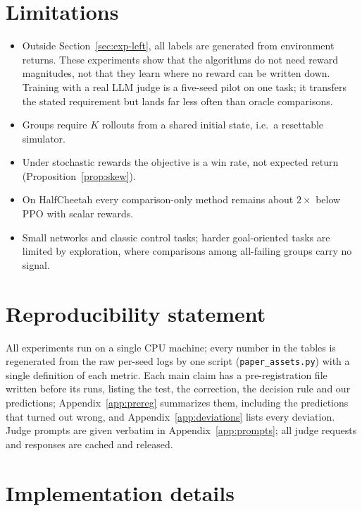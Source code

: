 \documentclass[11pt]{article}
\theoremstyle{remark}
\begin{document}
\section{Limitations}
\begin{itemize}
\item Outside Section~\ref{sec:exp-left}, all labels are generated from environment returns. These experiments show that the algorithms do not need reward magnitudes, not that they learn where no reward can be written down. Training with a real LLM judge is a five-seed pilot on one task; it transfers the stated requirement but lands far less often than oracle comparisons.
\item Groups require $K$ rollouts from a shared initial state, i.e.\ a resettable simulator.
\item Under stochastic rewards the objective is a win rate, not expected return (Proposition~\ref{prop:skew}).
\item On HalfCheetah every comparison-only method remains about $2\times$ below PPO with scalar rewards.
\item Small networks and classic control tasks; harder goal-oriented tasks are limited by exploration, where comparisons among all-failing groups carry no signal.
\end{itemize}


\section*{Reproducibility statement}
All experiments run on a single CPU machine; every number in the tables is regenerated from the raw per-seed logs by one script (\texttt{paper\_assets.py}) with a single definition of each metric. Each main claim has a pre-registration file written before its runs, listing the test, the correction, the decision rule and our predictions; Appendix~\ref{app:prereg} summarizes them, including the predictions that turned out wrong, and Appendix~\ref{app:deviations} lists every deviation. Judge prompts are given verbatim in Appendix~\ref{app:prompts}; all judge requests and responses are cached and released.




\clearpage
\appendix
\section{Implementation details}
\label{app:impl}
\end{document}
